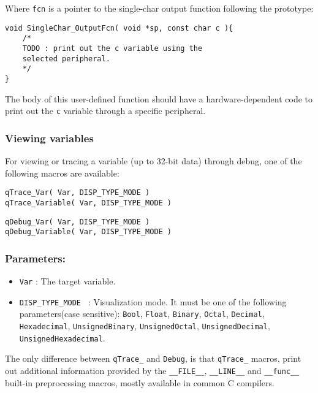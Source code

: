 Where \lstinline{fcn} is a pointer to the single-char output function following the prototype: \\

\begin{lstlisting}[style=CStyle]
void SingleChar_OutputFcn( void *sp, const char c ){
    /*
    TODO : print out the c variable using the
    selected peripheral.
    */
}
\end{lstlisting}

The body of this user-defined function should have a hardware-dependent code to print out the \lstinline{c} variable through a specific peripheral.

\subsubsection{Viewing variables}
For viewing or tracing a variable (up to 32-bit data) through debug, one of the following macros are available:    

\begin{lstlisting}[style=CStyle]
qTrace_Var( Var, DISP_TYPE_MODE )
qTrace_Variable( Var, DISP_TYPE_MODE )
\end{lstlisting}
\begin{lstlisting}[style=CStyle]
qDebug_Var( Var, DISP_TYPE_MODE )
qDebug_Variable( Var, DISP_TYPE_MODE )
\end{lstlisting}

\subsubsection*{Parameters:}
\begin{itemize}
    \item \lstinline{Var} : The target variable. 
    \item \lstinline{DISP_TYPE_MODE } :  Visualization mode. It must be one of the following parameters(case sensitive): \lstinline{Bool}, \lstinline{Float}, \lstinline{Binary}, \lstinline{Octal}, \lstinline{Decimal}, \lstinline{Hexadecimal}, \lstinline{UnsignedBinary}, \lstinline{UnsignedOctal}, \lstinline{UnsignedDecimal}, \lstinline{UnsignedHexadecimal}. 
\end{itemize}

The only difference between \lstinline{qTrace_} and  \lstinline{Debug}, is that \lstinline{qTrace_} macros, print out additional information provided by the \lstinline{__FILE__}, \lstinline{__LINE__} and \lstinline{__func__} built-in preprocessing macros, mostly available in common C compilers. 

